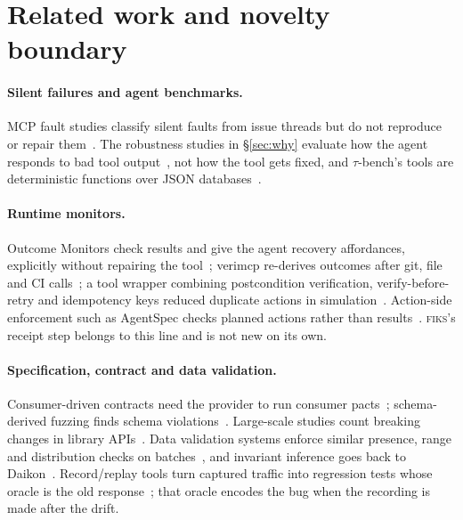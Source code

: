 \documentclass[10pt]{article}
\newcommand{\fiks}{\textsc{fiks}}
\begin{document}
\section{Related work and novelty boundary}
\label{sec:related}

\paragraph{Silent failures and agent benchmarks.} MCP fault studies classify silent faults from issue threads but do not reproduce or repair them~\cite{owotogbe2026mcpfaults}. The robustness studies in \S\ref{sec:why} evaluate how the agent responds to bad tool output~\cite{singh2026scapegoats,zhu2026toolmaze,yang2026overreliance}, not how the tool gets fixed, and $\tau$-bench's tools are deterministic functions over JSON databases~\cite{yao2024taubench}.

\paragraph{Runtime monitors.} Outcome Monitors check results and give the agent recovery affordances, explicitly without repairing the tool~\cite{panthi2026outcomemonitors}; verimcp re-derives outcomes after git, file and CI calls~\cite{verimcp}; a tool wrapper combining postcondition verification, verify-before-retry and idempotency keys reduced duplicate actions in simulation~\cite{mansoor2026verifiedtoolcalls}. Action-side enforcement such as AgentSpec checks planned actions rather than results~\cite{agentspec}. \fiks{}'s receipt step belongs to this line and is not new on its own.

\paragraph{Specification, contract and data validation.} Consumer-driven contracts need the provider to run consumer pacts~\cite{pact-how-it-works}; schema-derived fuzzing finds schema violations~\cite{hatfielddodds2022schemathesis}. Large-scale studies count breaking changes in library APIs~\cite{xavier2017apibreak,kong2025npm}. Data validation systems enforce similar presence, range and distribution checks on batches~\cite{tfdv-2019}, and invariant inference goes back to Daikon~\cite{daikon}. Record/replay tools turn captured traffic into regression tests whose oracle is the old response~\cite{keploy}; that oracle encodes the bug when the recording is made after the drift.
\end{document}
